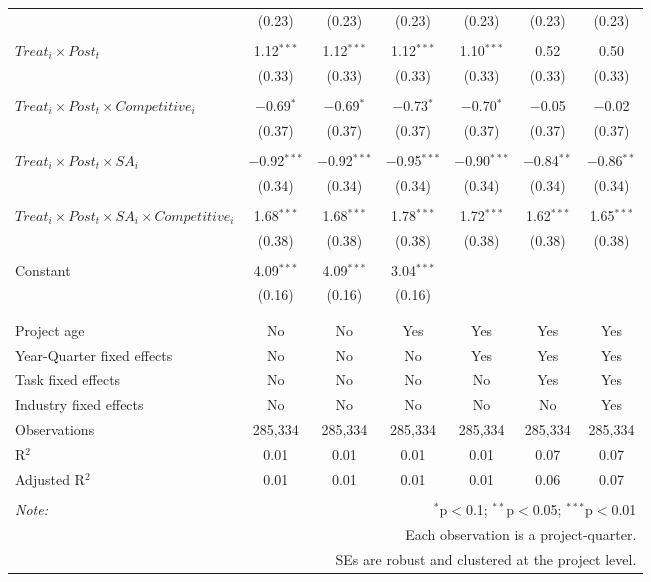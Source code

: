 \documentclass[
]{article}
\begin{document}
\begin{table}[H]
\begin{tabular}{@{\extracolsep{-3pt}}lcccccc}
  & (0.23) & (0.23) & (0.23) & (0.23) & (0.23) & (0.23) \\ 
  & & & & & & \\ 
 $Treat_i \times Post_t$ & 1.12$^{***}$ & 1.12$^{***}$ & 1.12$^{***}$ & 1.10$^{***}$ & 0.52 & 0.50 \\ 
  & (0.33) & (0.33) & (0.33) & (0.33) & (0.33) & (0.33) \\ 
  & & & & & & \\ 
 $Treat_i \times Post_t \times Competitive_i$ & $-$0.69$^{*}$ & $-$0.69$^{*}$ & $-$0.73$^{*}$ & $-$0.70$^{*}$ & $-$0.05 & $-$0.02 \\ 
  & (0.37) & (0.37) & (0.37) & (0.37) & (0.37) & (0.37) \\ 
  & & & & & & \\ 
 $Treat_i \times Post_t \times SA_i$ & $-$0.92$^{***}$ & $-$0.92$^{***}$ & $-$0.95$^{***}$ & $-$0.90$^{***}$ & $-$0.84$^{**}$ & $-$0.86$^{**}$ \\ 
  & (0.34) & (0.34) & (0.34) & (0.34) & (0.34) & (0.34) \\ 
  & & & & & & \\ 
 $Treat_i \times Post_t \times SA_i \times Competitive_i$ & 1.68$^{***}$ & 1.68$^{***}$ & 1.78$^{***}$ & 1.72$^{***}$ & 1.62$^{***}$ & 1.65$^{***}$ \\ 
  & (0.38) & (0.38) & (0.38) & (0.38) & (0.38) & (0.38) \\ 
  & & & & & & \\ 
 Constant & 4.09$^{***}$ & 4.09$^{***}$ & 3.04$^{***}$ &  &  &  \\ 
  & (0.16) & (0.16) & (0.16) &  &  &  \\ 
  & & & & & & \\ 
\hline \\[-1.8ex] 
Project age & No & No & Yes & Yes & Yes & Yes \\ 
Year-Quarter fixed effects & No & No & No & Yes & Yes & Yes \\ 
Task fixed effects & No & No & No & No & Yes & Yes \\ 
Industry fixed effects & No & No & No & No & No & Yes \\ 
Observations & 285,334 & 285,334 & 285,334 & 285,334 & 285,334 & 285,334 \\ 
R$^{2}$ & 0.01 & 0.01 & 0.01 & 0.01 & 0.07 & 0.07 \\ 
Adjusted R$^{2}$ & 0.01 & 0.01 & 0.01 & 0.01 & 0.06 & 0.07 \\ 
\hline 
\hline \\[-1.8ex] 
\textit{Note:}  & \multicolumn{6}{r}{$^{*}$p$<$0.1; $^{**}$p$<$0.05; $^{***}$p$<$0.01} \\ 
 & \multicolumn{6}{r}{Each observation is a project-quarter.} \\ 
 & \multicolumn{6}{r}{SEs are robust and clustered at the project level.} \\ 
\end{tabular} 
\end{table}
\end{document}
